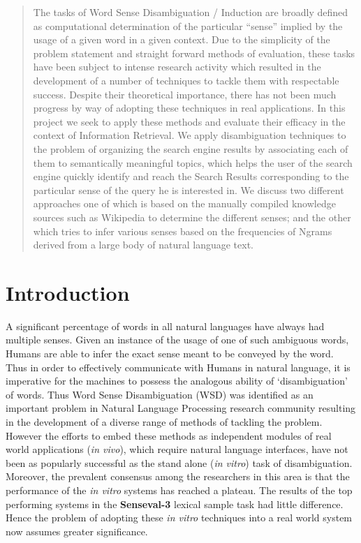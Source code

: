 \documentclass[a4paper,12pt]{report}
\def\baselinestretch{1.15}
\begin{document}
\newpage


\begin{abstract}
The tasks of Word Sense Disambiguation / Induction are broadly defined
as computational determination of the particular ``sense'' implied by
the usage of a given word in a given context. Due to the simplicity of
the problem statement and straight forward methods of evaluation,
these tasks have been subject to intense research activity which
resulted in the development of a number of techniques to tackle them
with respectable success. Despite their theoretical importance,  there
has not been much progress by way of adopting these techniques in real
applications. In this project we seek to apply these methods and
evaluate their efficacy in the context of Information Retrieval. We
apply disambiguation techniques to the problem of organizing the
search engine results by associating each of them to semantically
meaningful topics, which helps the user of the search engine quickly
identify and reach the Search Results corresponding to the particular
sense of the query he is interested in. We discuss two different
approaches one of which is based on the manually compiled knowledge
sources such as Wikipedia to determine the different senses; and the
other which tries to infer various senses based on the frequencies of
Ngrams derived from a large body of natural language text. 
\end{abstract}


\newpage

\listoftables

\newpage

\begingroup{}\def\baselinestretch{1.5}\tableofcontents\endgroup    
\newpage
{}
\chapter{Introduction}
A significant percentage of words in all natural languages have always
had multiple senses. Given an instance of the usage of one of such
ambiguous words, Humans are able to infer the exact sense meant to be
conveyed by the word. Thus in order to effectively communicate with
Humans in natural language, it is imperative for the machines to
possess the analogous ability of `disambiguation' of words. Thus Word
Sense Disambiguation (WSD) was identified as an important problem in
Natural Language Processing research community resulting in the
development of a diverse range of methods of tackling the
problem. However the efforts to embed these methods as independent
modules of real world applications ({\it in vivo}), which require
natural language interfaces, have not been as popularly successful as
the stand alone ({\it in vitro}) task of disambiguation. Moreover, the
prevalent consensus among the researchers in this area is that the
performance of the {\it in vitro} systems has reached a plateau. The
results of the top performing systems in the {\bf Senseval-3} lexical
sample task had little difference.\cite{chap4WSD} Hence the problem of
adopting these {\it in vitro} techniques into a real world system now
assumes greater significance.
\end{document}
